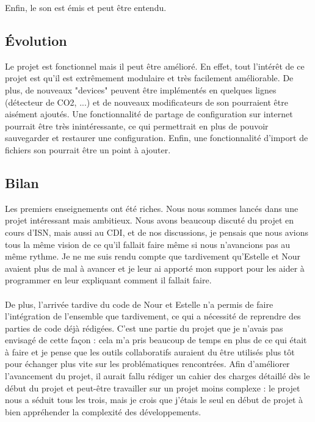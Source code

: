 \documentclass[12pt]{article}
\begin{document}
	Enfin, le son est émis et peut être entendu.
	\subsection{Évolution}
	Le projet est fonctionnel mais il peut être amélioré. En effet, tout l'intérêt de ce projet est qu'il est extrêmement modulaire et très facilement améliorable. De plus, de nouveaux "devices" peuvent être implémentés en quelques lignes (détecteur de CO2, ...) et de nouveaux modificateurs de son pourraient être aisément ajoutés. Une fonctionnalité de partage de configuration sur internet pourrait être très inintéressante, ce qui permettrait en plus de pouvoir sauvegarder et restaurer une configuration. Enfin, une fonctionnalité d'import de fichiers son pourrait être un point à ajouter.
	
	\subsection{Bilan}
	Les premiers enseignements ont été riches. Nous nous sommes lancés dans une projet intéressant mais ambitieux. Nous avons beaucoup discuté du projet en cours d'ISN, mais aussi au CDI, et de nos discussions, je pensais que nous avions tous la même vision de ce qu'il fallait faire même si nous n'avancions pas au même rythme. Je ne me suis rendu compte que tardivement qu'Estelle et Nour avaient plus de mal à avancer et je leur ai apporté mon support pour les aider à programmer en leur expliquant comment il fallait faire.
	
	\paragraph{}
	De plus, l'arrivée tardive du code de Nour et Estelle n'a permis de faire l'intégration de l'ensemble que tardivement, ce qui a nécessité de reprendre des parties de code déjà rédigées. C'est une partie du projet que je n'avais pas envisagé de cette façon : cela m'a pris beaucoup de temps en plus de ce qui était à faire et je pense que les outils collaboratifs auraient du être utilisés plus tôt pour échanger plus vite sur les problématiques rencontrées. Afin d'améliorer l'avancement du projet, il aurait fallu rédiger un cahier des charges détaillé dès le début du projet et peut-être travailler sur un projet moins complexe : le projet nous a séduit tous les trois, mais je crois que j'étais le seul en début de projet à bien appréhender la complexité des développements.
	
\end{document}
